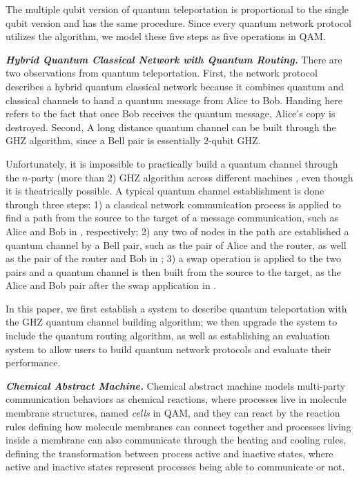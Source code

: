 The multiple qubit version of quantum teleportation \cite{Rigolin_2005} is proportional to the single qubit version
and has the same procedure.
Since every quantum network protocol utilizes the algorithm, we model these five steps as five operations in QAM.

\noindent\textbf{\textit{Hybrid Quantum Classical Network with Quantum Routing.}}
There are two observations from quantum teleportation. First, the network protocol describes a hybrid quantum classical network because it combines quantum and classical channels to hand a quantum message from Alice to Bob. Handing here refers to the fact that once Bob receives the quantum message, Alice's copy is destroyed. Second, A long distance quantum channel can be built through the GHZ algorithm, since a Bell pair is essentially $2$-qubit GHZ.

Unfortunately, it is impossible to practically build a quantum channel through the $n$-party (more than $2$) GHZ algorithm across different machines \cite{Illiano_2022}, even though it is theatrically possible.
A typical quantum channel establishment is done through three steps: 1) a classical network communication process is applied to find a path from the source to the target of a message communication, such as Alice and Bob in , respectively; 2) any two of nodes in the path are established a quantum channel by a Bell pair, such as the pair of Alice and the router, as well as the pair of the router and Bob in ; 3) a swap operation is applied to the two pairs and a quantum channel is then built from the source to the target, as the Alice and Bob pair after the swap application in .

In this paper, we first establish a system to describe quantum teleportation with the GHZ quantum channel building algorithm;
we then upgrade the system to include the quantum routing algorithm, as well as establishing an evaluation system to allow users to build quantum network protocols and evaluate their performance.

\noindent\textbf{\textit{Chemical Abstract Machine.}} Chemical abstract machine \cite{BERRY1992217} models multi-party communication behaviors as chemical reactions, where processes live in molecule membrane structures, named \textit{cells} in QAM, and they can react by the reaction rules defining how molecule membranes can connect together and processes living inside a membrane can also communicate through the heating and cooling rules, 
defining the transformation between process active and inactive states, where active and inactive states represent processes being able to communicate or not.

